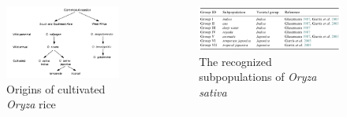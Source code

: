 \documentclass[
  ignorenonframetext,
  aspectratio=169]{beamer}
\begin{document}
\begin{frame}{}
\protect\hypertarget{section-14}{}
\begin{columns}[T,onlytextwidth]

\begin{figure}
\includegraphics[width=0.9\linewidth]{./../images/cultivated-rice-type-evolution} \caption{Origins of cultivated \textit{Oryza} rice}\label{fig:cultivated-rice-evolution}
\end{figure}


\begin{figure}
\includegraphics[width=0.99\linewidth]{./../images/rice_subpopulations} \caption{The recognized subpopulations of \textit{Oryza sativa}}\label{fig:subpopulations-rice}
\end{figure}

\end{columns}
\end{frame}
\end{document}
